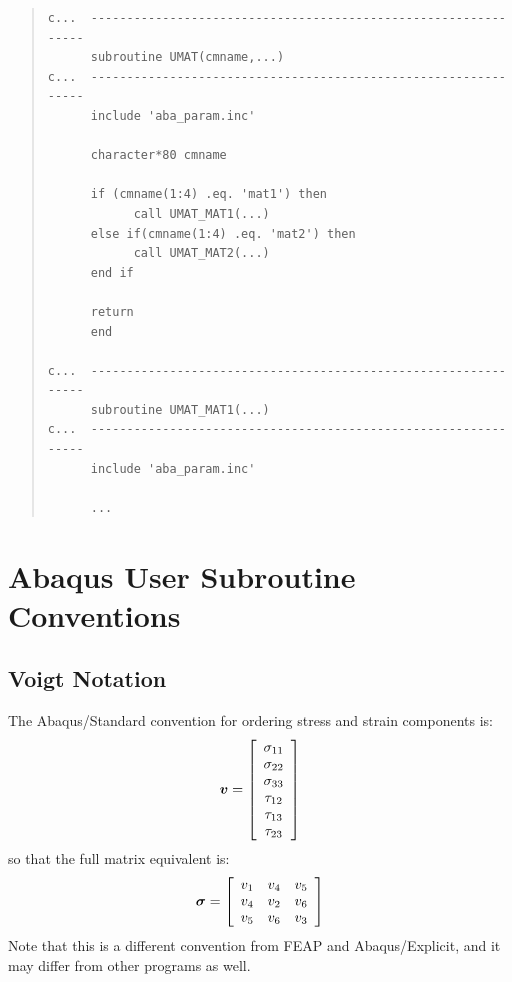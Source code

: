 \documentclass[10pt,letterpaper,oneside]{report}
\newcommand{\ten}[1]{\mbox{\boldmath $#1$}{}}
\begin{document}
\newpage
\begin{quote} \begin{lstlisting}
c...  ---------------------------------------------------------------
      subroutine UMAT(cmname,...)
c...  ---------------------------------------------------------------
      include 'aba_param.inc'
      
      character*80 cmname

      if (cmname(1:4) .eq. 'mat1') then
            call UMAT_MAT1(...)
      else if(cmname(1:4) .eq. 'mat2') then
            call UMAT_MAT2(...)
      end if

      return
      end

c...  ---------------------------------------------------------------
      subroutine UMAT_MAT1(...)
c...  ---------------------------------------------------------------
      include 'aba_param.inc'

      ...
\end{lstlisting} \end{quote}


\section{Abaqus User Subroutine Conventions}

\subsection{Voigt Notation}
The Abaqus/Standard convention for ordering stress and strain components is:
\[ \ten{v} = \left[ \begin{array}{c}
\sigma_{11} \\ \sigma_{22} \\ \sigma_{33} \\
\tau_{12} \\ \tau_{13} \\ \tau_{23}
\end{array} \right] \] 
so that the full matrix equivalent is: 
\[ \ten{\sigma} = 
\left[ \begin{array}{ccc}
v_1 & v_4 & v_5 \\
v_4 & v_2 & v_6 \\
v_5 & v_6 & v_3 
\end{array} \right] \] 
Note that this is a different convention from FEAP and Abaqus/Explicit, and it may differ from other programs as well.
\end{document}
